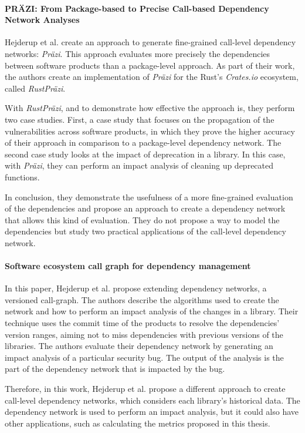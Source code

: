\paragraph{PRÄZI: From Package-based to Precise Call-based Dependency Network Analyses \cite{hejderup2018prazi}}
Hejderup et al. create an approach to generate fine-grained call-level dependency networks: \textit{Präzi}. This approach evaluates more precisely the dependencies between software products than a package-level approach. As part of their work, the authors create an implementation of \textit{Präzi} for the Rust's \textit{Crates.io} ecosystem, called \textit{RustPräzi}.

With \textit{RustPräzi}, and to demonstrate how effective the approach is, they perform two case studies. First, a case study that focuses on the propagation of the vulnerabilities across software products, in which they prove the higher accuracy of their approach in comparison to a package-level dependency network. The second case study looks at the impact of deprecation in a library. In this case, with \textit{Präzi}, they can perform an impact analysis of cleaning up deprecated functions.

In conclusion, they demonstrate the usefulness of a more fine-grained evaluation of the dependencies and propose an approach to create a dependency network that allows this kind of evaluation. They do not propose a way to model the dependencies but study two practical applications of the call-level dependency network.

\paragraph{Software ecosystem call graph for dependency management \cite{hejderup2018software}}
In this paper, Hejderup et al. propose extending dependency networks, a versioned call-graph. The authors describe the algorithms used to create the network and how to perform an impact analysis of the changes in a library. Their technique uses the commit time of the products to resolve the dependencies' version ranges, aiming not to miss dependencies with previous versions of the libraries. The authors evaluate their dependency network by generating an impact analysis of a particular security bug. The output of the analysis is the part of the dependency network that is impacted by the bug.

Therefore, in this work, Hejderup et al. propose a different approach to create call-level dependency networks, which considers each library's historical data. The dependency network is used to perform an impact analysis, but it could also have other applications, such as calculating the metrics proposed in this thesis.

